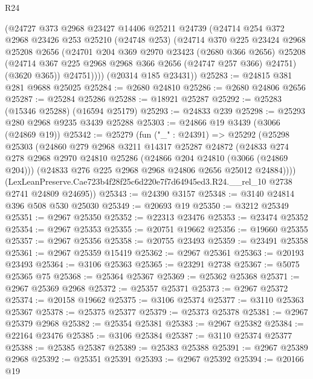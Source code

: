 \begin{lexlean}{R24}
\begin{coremodule}
        (@24727
          @373
          @2968
          @23427
          @14406
          @25211
          @24739
          (@24714
            @254
            @372
            @2968
            @23426
            @253
            @25210
            (@24748 @253)
            (@24714
              @370
              @225
              @23424
              @2968
              @25208
              @2656
              (@24701
                @204
                @369
                @2970
                @23423
                (@2680 @366 @2656)
                @25208
                (@24714 @367 @225 @2968 @2968 @366 @2656 (@24747 @257 @366) @24751)
                (@3620 @365))
              @24751))))
      (@20314 @185 @23431))
@25283 := @24815 @381 @281 @9688 @25025
@25284 := @2680 @24810
@25286 := @2680 @24806 @2656
@25287 := @25284 @25286
@25288 := @18921 @25287
@25292 := @25283 (@15346 @25288) (@16594 @25179)
@25293 := @24833 @239
@25298 := @25293 @280 @2968 @9235 @3439 @25288
@25303 := @24866 @19 @3439 (@3066 (@24869 @19))
@25342 := @25279
    (fun ("_" : @24391) =>
    @25292
      (@25298
        @25303
        (@24860
          @279
          @2968
          @3211
          @14317
          @25287
          @24872
          (@24833
            @274
            @278
            @2968
            @2970
            @24810
            @25286
            (@24866 @204 @24810 (@3066 (@24869 @204)))
            (@24833 @276 @225 @2968 @2968 @24806 @2656 @25012 @24884))))
      (LexLeanPreserve.Cae723b4f28f25c6d220e7f7d64945ed3.R24.__rel_10 @2738 @2741 @24809 @24695))
@25343 := @24390 @3157
@25348 := @3140 @24814 @396 @508 @530 @25030
@25349 := @20693 @19
@25350 := @3212 @25349
@25351 := @2967 @25350
@25352 := @22313 @23476
@25353 := @23474 @25352
@25354 := @2967 @25353
@25355 := @20751 @19662
@25356 := @19660 @25355
@25357 := @2967 @25356
@25358 := @20755 @23493
@25359 := @23491 @25358
@25361 := @2967 @25359 @15419
@25362 := @2967 @25361
@25363 := @20193 @23493
@25364 := @3106 @25363
@25365 := @23291 @2738
@25367 := @5075 @25365 @75
@25368 := @25364 @25367
@25369 := @25362 @25368
@25371 := @2967 @25369 @2968
@25372 := @25357 @25371
@25373 := @2967 @25372
@25374 := @20158 @19662
@25375 := @3106 @25374
@25377 := @3110 @25363 @25367
@25378 := @25375 @25377
@25379 := @25373 @25378
@25381 := @2967 @25379 @2968
@25382 := @25354 @25381
@25383 := @2967 @25382
@25384 := @22164 @23476
@25385 := @3106 @25384
@25387 := @3110 @25374 @25377
@25388 := @25385 @25387
@25389 := @25383 @25388
@25391 := @2967 @25389 @2968
@25392 := @25351 @25391
@25393 := @2967 @25392
@25394 := @20166 @19

\end{coremodule}
\end{lexlean}
